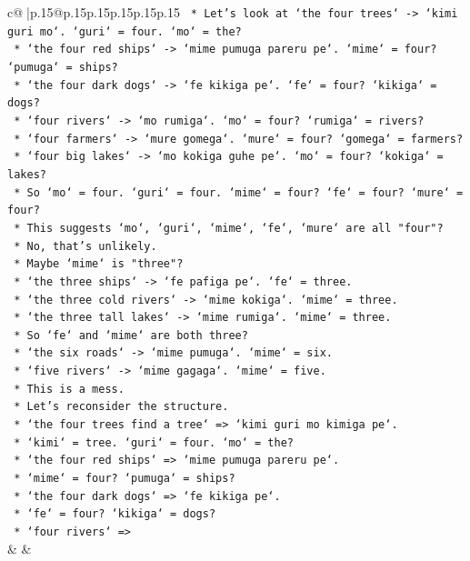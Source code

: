 \documentclass{article}
\begin{document}
{\begin{supertabular}{c@{$\;$}|p{.15\linewidth}@{}p{.15\linewidth}p{.15\linewidth}p{.15\linewidth}p{.15\linewidth}p{.15\linewidth}}
{{{\texttt{            *   Let's look at `the four trees` {-}> `kimi guri mo`. `guri` = four. `mo` = the?} \\
\texttt{            *   `the four red ships` {-}> `mime pumuga pareru pe`. `mime` = four? `pumuga` = ships?} \\
\texttt{            *   `the four dark dogs` {-}> `fe kikiga pe`. `fe` = four? `kikiga` = dogs?} \\
\texttt{            *   `four rivers` {-}> `mo rumiga`. `mo` = four? `rumiga` = rivers?} \\
\texttt{            *   `four farmers` {-}> `mure gomega`. `mure` = four? `gomega` = farmers?} \\
\texttt{            *   `four big lakes` {-}> `mo kokiga guhe pe`. `mo` = four? `kokiga` = lakes?} \\
\texttt{            *   So `mo` = four. `guri` = four. `mime` = four? `fe` = four? `mure` = four?} \\
\texttt{            *   This suggests `mo`, `guri`, `mime`, `fe`, `mure` are all "four"?} \\
\texttt{            *   No, that's unlikely.} \\
\texttt{            *   Maybe `mime` is "three"?} \\
\texttt{            *   `the three ships` {-}> `fe pafiga pe`. `fe` = three.} \\
\texttt{            *   `the three cold rivers` {-}> `mime kokiga`. `mime` = three.} \\
\texttt{            *   `the three tall lakes` {-}> `mime rumiga`. `mime` = three.} \\
\texttt{            *   So `fe` and `mime` are both three?} \\
\texttt{            *   `the six roads` {-}> `mime pumuga`. `mime` = six.} \\
\texttt{            *   `five rivers` {-}> `mime gagaga`. `mime` = five.} \\
\texttt{            *   This is a mess.} \\
\texttt{            *   Let's reconsider the structure.} \\
\texttt{            *   `the four trees find a tree` => `kimi guri mo kimiga pe`.} \\
\texttt{            *   `kimi` = tree. `guri` = four. `mo` = the?} \\
\texttt{            *   `the four red ships` => `mime pumuga pareru pe`.} \\
\texttt{            *   `mime` = four? `pumuga` = ships?} \\
\texttt{            *   `the four dark dogs` => `fe kikiga pe`.} \\
\texttt{            *   `fe` = four? `kikiga` = dogs?} \\
\texttt{            *   `four rivers` =>} \\
            }
        }
    }
    & & \\ \\


\end{supertabular}}
\end{document}
